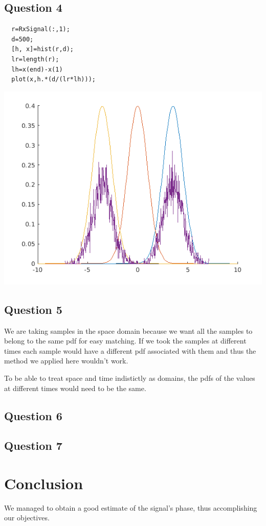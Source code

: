 \documentclass[conference,9pt]{IEEEtran}
\begin{document}
\subsection{Question 4}

\begin{verbatim}
  r=RxSignal(:,1);
  d=500;
  [h, x]=hist(r,d);
  lr=length(r);
  lh=x(end)-x(1)
  plot(x,h.*(d/(lr*lh)));
\end{verbatim}
\includegraphics[scale=0.6]{4}

\subsection{Question 5}
We are taking samples in the space domain because we want all the samples to belong to the same pdf for easy matching. If we took the samples at different times each sample would have a different pdf associated with them and thus the method we applied here wouldn't work.

To be able to treat space and time indistictly as domains, the pdfs of the values at different times would need to be the same.
\subsection{Question 6}

\subsection{Question 7}


\section{Conclusion}
We managed to obtain a good estimate of the signal's phase, thus accomplishing our objectives.
\end{document}

